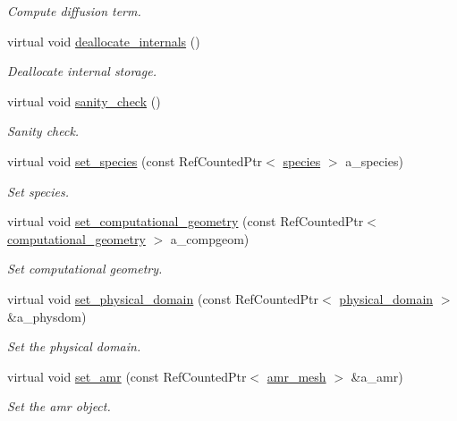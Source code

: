 \begin{DoxyCompactItemize}
\begin{DoxyCompactList}\small\item\em Compute diffusion term. \end{DoxyCompactList}\item 
virtual void \hyperlink{classcdr__solver_a3bfad2af36227743cedeb575704fda8f}{deallocate\+\_\+internals} ()
\begin{DoxyCompactList}\small\item\em Deallocate internal storage. \end{DoxyCompactList}\item 
virtual void \hyperlink{classcdr__solver_ac585269269cb8b64b32aeb5d185d2101}{sanity\+\_\+check} ()
\begin{DoxyCompactList}\small\item\em Sanity check. \end{DoxyCompactList}\item 
virtual void \hyperlink{classcdr__solver_aef7f5a0d1f99482908404afdb9163ddf}{set\+\_\+species} (const Ref\+Counted\+Ptr$<$ \hyperlink{classspecies}{species} $>$ a\+\_\+species)
\begin{DoxyCompactList}\small\item\em Set species. \end{DoxyCompactList}\item 
virtual void \hyperlink{classcdr__solver_a7a744018934f8f1bba500dc1acbf518d}{set\+\_\+computational\+\_\+geometry} (const Ref\+Counted\+Ptr$<$ \hyperlink{classcomputational__geometry}{computational\+\_\+geometry} $>$ a\+\_\+compgeom)
\begin{DoxyCompactList}\small\item\em Set computational geometry. \end{DoxyCompactList}\item 
virtual void \hyperlink{classcdr__solver_a9871334e3d7f2fe1152000c4b5501d90}{set\+\_\+physical\+\_\+domain} (const Ref\+Counted\+Ptr$<$ \hyperlink{classphysical__domain}{physical\+\_\+domain} $>$ \&a\+\_\+physdom)
\begin{DoxyCompactList}\small\item\em Set the physical domain. \end{DoxyCompactList}\item 
virtual void \hyperlink{classcdr__solver_a9fd622d252e82f8c04669ba87d115aa6}{set\+\_\+amr} (const Ref\+Counted\+Ptr$<$ \hyperlink{classamr__mesh}{amr\+\_\+mesh} $>$ \&a\+\_\+amr)
\begin{DoxyCompactList}\small\item\em Set the amr object. \end{DoxyCompactList}\item 

\end{DoxyCompactItemize}
